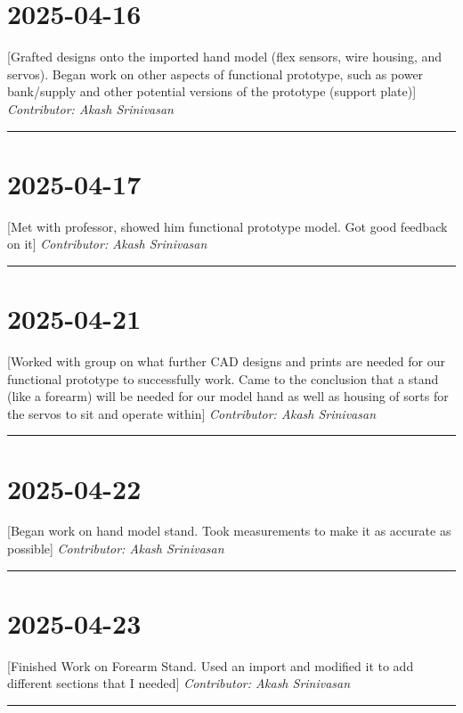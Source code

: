 \documentclass[12pt]{article}
\begin{document}
\section*{2025-04-16}
[Grafted designs onto the imported hand model (flex sensors, wire housing, and servos). Began work on other aspects of functional prototype, such as power bank/supply and other potential versions of the prototype (support plate)]
\vspace{1em}
\noindent\textit{Contributor: Akash Srinivasan}
\vspace{1em}
\hrule

\section*{2025-04-17}
[Met with professor, showed him functional prototype model. Got good feedback on it]
\vspace{1em}
\noindent\textit{Contributor: Akash Srinivasan}
\vspace{1em}
\hrule

\section*{2025-04-21}
[Worked with group on what further CAD designs and prints are needed for our functional prototype to successfully work. Came to the conclusion that a stand (like a forearm) will be needed for our model hand as well as housing of sorts for the servos to sit and operate within]
\vspace{1em}
\noindent\textit{Contributor: Akash Srinivasan}
\vspace{1em}
\hrule

\section*{2025-04-22}
[Began work on hand model stand. Took measurements to make it as accurate as possible]
\vspace{1em}
\noindent\textit{Contributor: Akash Srinivasan}
\vspace{1em}
\hrule

\section*{2025-04-23}
[Finished Work on Forearm Stand. Used an import and modified it to add different sections that I needed]
\vspace{1em}
\noindent\textit{Contributor: Akash Srinivasan}
\vspace{1em}
\hrule
\end{document}
